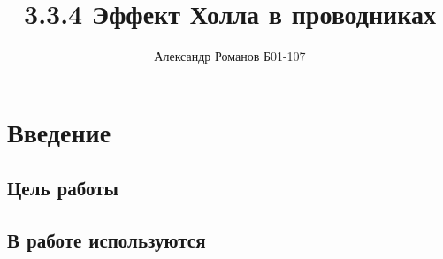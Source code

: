 \documentclass{article}
\author{Александр Романов Б01-107}
\date{}
\title{3.3.4 Эффект Холла в проводниках}
\begin{document}
\maketitle
\section{Введение}
\subsection{Цель работы}
\subsection{В работе используются} 
\end{document}
